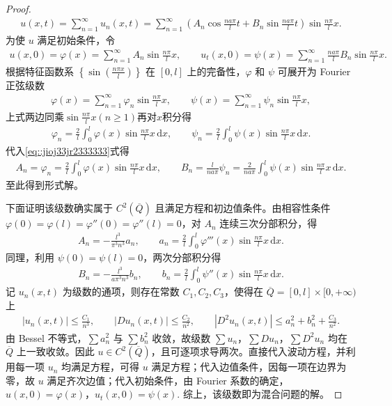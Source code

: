 \documentclass[../../main.tex]{subfiles}%
\begin{document}
\begin{proof}
\begin{align*}
u(x,t)=\sum_{n=1}^{\infty}u_n(x,t)
=\sum_{n=1}^{\infty}\left(A_n\cos\frac{na\pi}{l}t+B_n\sin\frac{na\pi}{l}t\right)\sin\frac{n\pi}{l}x.
\end{align*}
为使 $u$ 满足初始条件，令
\begin{align}\label{eq::jioj33jr2333333}
u(x,0)=\varphi(x)=\sum_{n=1}^{\infty}A_n\sin\frac{n\pi}{l}x,\qquad
u_t(x,0)=\psi(x)=\sum_{n=1}^{\infty}\frac{na\pi}{l}B_n\sin\frac{n\pi}{l}x.
\end{align}
根据特征函数系 $\left\{ \sin \left( \frac{n\pi x}{l} \right) \right\} $ 在 $[0,l]$ 上的完备性，$\varphi$ 和 $\psi$ 可展开为 Fourier 正弦级数
\begin{align*}
\varphi(x)=\sum_{n=1}^{\infty}\varphi_n\sin\frac{n\pi}{l}x,\qquad
\psi(x)=\sum_{n=1}^{\infty}\psi_n\sin\frac{n\pi}{l}x,
\end{align*}
上式两边同乘$\sin\frac{n\pi}{l}x(n\geqslant 1)$再对$x$积分得
\begin{align*}
\varphi_n=\frac{2}{l}\int_0^l\varphi(x)\sin\frac{n\pi}{l}x\,\mathrm{d}x,\qquad
\psi_n=\frac{2}{l}\int_0^l\psi(x)\sin\frac{n\pi}{l}x\,\mathrm{d}x.
\end{align*}
代入\eqref{eq::jioj33jr2333333}式得
\begin{align*}
A_n=\varphi_n=\frac{2}{l}\int_0^l\varphi(x)\sin\frac{n\pi}{l}x\,\mathrm{d}x,\qquad
B_n=\frac{l}{na\pi}\psi_n=\frac{2}{na\pi}\int_0^l\psi(x)\sin\frac{n\pi}{l}x\,\mathrm{d}x.
\end{align*}
至此得到形式解。

下面证明该级数确实属于 $C^2(\overline{Q})$ 且满足方程和初边值条件。由相容性条件 $\varphi(0)=\varphi(l)=\varphi''(0)=\varphi''(l)=0$，对 $A_n$ 连续三次分部积分，得
\begin{align*}
A_n=-\frac{l^3}{\pi^3 n^3}a_n,\qquad a_n=\frac{2}{l}\int_0^l\varphi'''(x)\sin\frac{n\pi}{l}x\,\mathrm{d}x.
\end{align*}
同理，利用 $\psi(0)=\psi(l)=0$，两次分部积分得
\begin{align*}
B_n=-\frac{l^3}{a\pi^3 n^3}b_n,\qquad b_n=\frac{2}{l}\int_0^l\psi''(x)\sin\frac{n\pi}{l}x\,\mathrm{d}x.
\end{align*}
记 $u_n(x,t)$ 为级数的通项，则存在常数 $C_1,C_2,C_3$，使得在 $\overline{Q}=[0,l]\times[0,+\infty)$ 上
\begin{align*}
|u_n(x,t)|\leqslant \frac{C_1}{n^3},\qquad |Du_n(x,t)|\leqslant \frac{C_2}{n^2},\qquad |D^2u_n(x,t)|\leqslant a_n^2+b_n^2+\frac{C_3}{n^2}.
\end{align*}
由 Bessel 不等式，$\sum a_n^2$ 与 $\sum b_n^2$ 收敛，故级数 $\sum u_n$，$\sum Du_n$，$\sum D^2u_n$ 均在 $\overline{Q}$ 上一致收敛。因此 $u\in C^2(\overline{Q})$，且可逐项求导两次。直接代入波动方程，并利用每一项 $u_n$ 均满足方程，可得 $u$ 满足方程；代入边值条件，因每一项在边界为零，故 $u$ 满足齐次边值；代入初始条件，由 Fourier 系数的确定，$u(x,0)=\varphi(x)$，$u_t(x,0)=\psi(x)$. 综上，该级数即为混合问题的解。


\end{proof}
\end{document}
